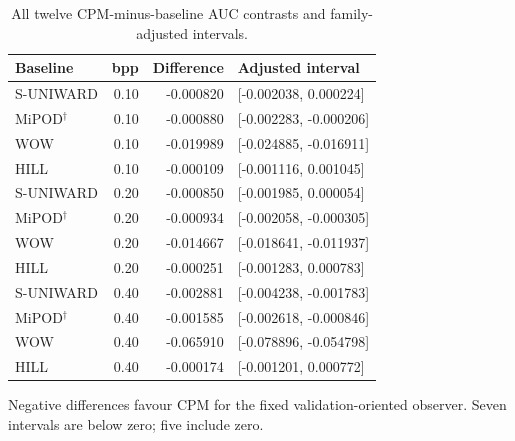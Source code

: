 \documentclass[journal]{IEEEtran}
\renewcommand{\arraystretch}{1.2}
\renewcommand{\arraystretch}{1.0}
\theoremstyle{definition}
\theoremstyle{game}
\renewcommand{\arraystretch}{1.5}
\begin{document}
\begin{table}[!t]
\centering\footnotesize
\caption{All twelve CPM-minus-baseline AUC contrasts and family-adjusted intervals.}
\label{tab:hsm-contrasts}
\setlength{\tabcolsep}{4pt}\renewcommand{\arraystretch}{1.15}
\begin{tabular}{lrrl}
\toprule
Baseline & bpp & Difference & Adjusted interval\\
\midrule
S-UNIWARD & 0.10 & -0.000820 & [-0.002038, 0.000224]\\
MiPOD$^\dagger$ & 0.10 & -0.000880 & [-0.002283, -0.000206]\\
WOW & 0.10 & -0.019989 & [-0.024885, -0.016911]\\
HILL & 0.10 & -0.000109 & [-0.001116, 0.001045]\\
S-UNIWARD & 0.20 & -0.000850 & [-0.001985, 0.000054]\\
MiPOD$^\dagger$ & 0.20 & -0.000934 & [-0.002058, -0.000305]\\
WOW & 0.20 & -0.014667 & [-0.018641, -0.011937]\\
HILL & 0.20 & -0.000251 & [-0.001283, 0.000783]\\
S-UNIWARD & 0.40 & -0.002881 & [-0.004238, -0.001783]\\
MiPOD$^\dagger$ & 0.40 & -0.001585 & [-0.002618, -0.000846]\\
WOW & 0.40 & -0.065910 & [-0.078896, -0.054798]\\
HILL & 0.40 & -0.000174 & [-0.001201, 0.000772]\\
\bottomrule
\end{tabular}
\par\smallskip\parbox{.97\textwidth}{\footnotesize Negative differences favour CPM for the fixed validation-oriented observer. Seven intervals are below zero; five include zero.}
\end{table}
\end{document}
